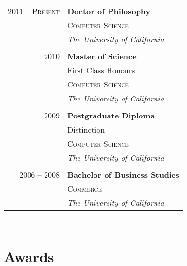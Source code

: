 \documentclass[10pt]{article} %
\begin{document}
{\begin{minipage}[t]{0.44\textwidth}
\begin{tabular}{rl}

2011 -- \textsc{Present} & \textbf{Doctor of Philosophy} \\ 
& \textsc{Computer Science} \\ 
& \textit{The University of California}\\
&\\
	 

2010 & \textbf{Master of Science} \\ 
& \small First Class Honours \\
& \textsc{Computer Science} \\ 
& \textit{The University of California}\\
&\\
	 

2009 & \textbf{Postgraduate Diploma}\\
& \small Distinction \\
& \textsc{Computer Science} \\
& \textit{The University of California}\\
&\\
	 

2006 -- 2008 & \textbf{Bachelor of Business Studies}\\
& \textsc{Commerce} \\
& \textit{The University of California} 
	

\end{tabular}\\[10pt]


\section{Awards} 


\end{minipage}}
\end{document}
